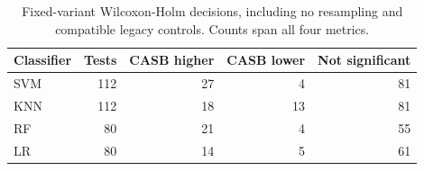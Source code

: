\begin{table}[pos=!htbp]
\centering\small
\caption{Fixed-variant Wilcoxon-Holm decisions, including no resampling and compatible legacy controls. Counts span all four metrics.}\label{tab:significance}
\begin{tabular}{lrrrr}\toprule
Classifier & Tests & CASB higher & CASB lower & Not significant \\
\midrule
SVM & 112 & 27 & 4 & 81 \\
KNN & 112 & 18 & 13 & 81 \\
RF & 80 & 21 & 4 & 55 \\
LR & 80 & 14 & 5 & 61 \\
\bottomrule\end{tabular}
\end{table}
